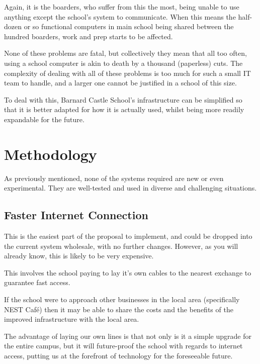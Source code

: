 \documentclass[a4paper,leqno,titlepage]{article}
\begin{document}
Again, it is the boarders, who suffer from this the most, being unable to use
anything except the school's system to communicate. When this means the
half-dozen or so functional computers in main school being shared between the
hundred boarders, work and prep starts to be affected.


None of these problems are fatal, but collectively they mean that all too often,
using a school computer is akin to death by a thousand (paperless) cuts.
The complexity of dealing with all of these problems is too much for such a
small IT team to handle, and a larger one cannot be justified in a school of
this size.


To deal with this, Barnard Castle School's infrastructure can be simplified
so that it is better adapted for how it is actually used, whilst being more
readily expandable for the future.



\break

\section{Methodology}


As previously mentioned, none of the systems required are new or even
experimental. They are well-tested and used in diverse and challenging
situations.

\subsection{Faster Internet Connection}


This is the easiest part of the proposal to implement, and could be dropped
into the current system wholesale, with no further changes. However, as you will
already know, this is likely to be very expensive.


This involves the school paying to lay it's own cables to the nearest exchange
to guarantee fast access.


If the school were to approach other businesses in the local area (specifically
NEST Café) then it may be able to share the costs and the benefits of the
improved infrastructure with the local area.


The advantage of laying our own lines is that not only is it a simple upgrade
for the entire campus, but it will future-proof the school with regards to
internet access, putting us at the forefront of technology for the foreseeable
future.
\end{document}
